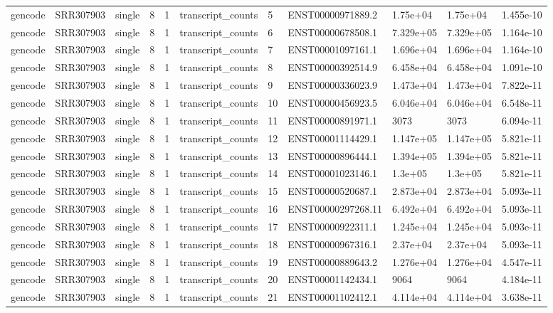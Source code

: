 \begin{tabular}{lllllllllll}
gencode & SRR307903 & single & 8 & 1 & transcript\_counts & 5 & ENST00000971889.2 & 1.75e+04 & 1.75e+04 & 1.455e-10 \\
gencode & SRR307903 & single & 8 & 1 & transcript\_counts & 6 & ENST00000678508.1 & 7.329e+05 & 7.329e+05 & 1.164e-10 \\
gencode & SRR307903 & single & 8 & 1 & transcript\_counts & 7 & ENST00001097161.1 & 1.696e+04 & 1.696e+04 & 1.164e-10 \\
gencode & SRR307903 & single & 8 & 1 & transcript\_counts & 8 & ENST00000392514.9 & 6.458e+04 & 6.458e+04 & 1.091e-10 \\
gencode & SRR307903 & single & 8 & 1 & transcript\_counts & 9 & ENST00000336023.9 & 1.473e+04 & 1.473e+04 & 7.822e-11 \\
gencode & SRR307903 & single & 8 & 1 & transcript\_counts & 10 & ENST00000456923.5 & 6.046e+04 & 6.046e+04 & 6.548e-11 \\
gencode & SRR307903 & single & 8 & 1 & transcript\_counts & 11 & ENST00000891971.1 & 3073 & 3073 & 6.094e-11 \\
gencode & SRR307903 & single & 8 & 1 & transcript\_counts & 12 & ENST00001114429.1 & 1.147e+05 & 1.147e+05 & 5.821e-11 \\
gencode & SRR307903 & single & 8 & 1 & transcript\_counts & 13 & ENST00000896444.1 & 1.394e+05 & 1.394e+05 & 5.821e-11 \\
gencode & SRR307903 & single & 8 & 1 & transcript\_counts & 14 & ENST00001023146.1 & 1.3e+05 & 1.3e+05 & 5.821e-11 \\
gencode & SRR307903 & single & 8 & 1 & transcript\_counts & 15 & ENST00000520687.1 & 2.873e+04 & 2.873e+04 & 5.093e-11 \\
gencode & SRR307903 & single & 8 & 1 & transcript\_counts & 16 & ENST00000297268.11 & 6.492e+04 & 6.492e+04 & 5.093e-11 \\
gencode & SRR307903 & single & 8 & 1 & transcript\_counts & 17 & ENST00000922311.1 & 1.245e+04 & 1.245e+04 & 5.093e-11 \\
gencode & SRR307903 & single & 8 & 1 & transcript\_counts & 18 & ENST00000967316.1 & 2.37e+04 & 2.37e+04 & 5.093e-11 \\
gencode & SRR307903 & single & 8 & 1 & transcript\_counts & 19 & ENST00000889643.2 & 1.276e+04 & 1.276e+04 & 4.547e-11 \\
gencode & SRR307903 & single & 8 & 1 & transcript\_counts & 20 & ENST00001142434.1 & 9064 & 9064 & 4.184e-11 \\
gencode & SRR307903 & single & 8 & 1 & transcript\_counts & 21 & ENST00001102412.1 & 4.114e+04 & 4.114e+04 & 3.638e-11 \\

\end{tabular}
